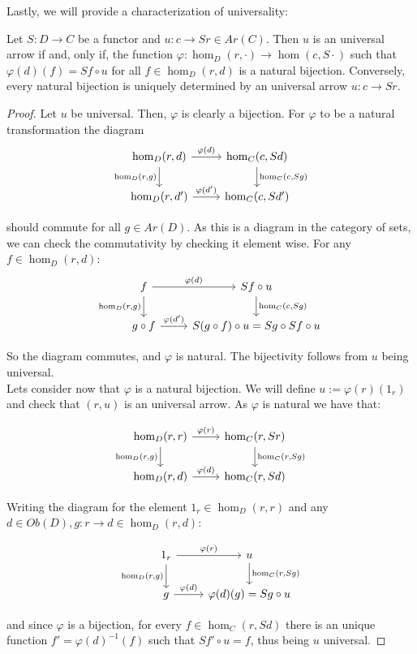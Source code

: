Lastly, we will provide a characterization of universality:
\begin{proposition}\label{Yoneda-proposition}
  Let $S: D \to C$ be a functor and $u:c\to Sr\in Ar(C)$. Then $u$ is an universal arrow if and, only if, the function $\varphi:\hom_D(r,\cdot)\to \hom(c,S\cdot)$ such that $\varphi(d)(f)= Sf\circ u$ for all $f\in \hom_D(r,d)$ is a natural bijection. Conversely, every natural bijection is uniquely determined by an universal arrow $u:c\to Sr$. 
\end{proposition}
\begin{proof}
  Let $u$ be universal. Then, $\varphi$ is clearly a bijection. For $\varphi$ to be a natural transformation the diagram 
  \[
    \begin{tikzcd}
      \hom_D(r,d)\arrow[swap]{d}{\hom_D(r,g)}\arrow{r}{\varphi(d)} & \hom_C(c,Sd)\arrow{d}{\hom_C(c,Sg)}\\
      \hom_D(r,d')\arrow{r}{\varphi(d')} & \hom_C(c,Sd')
    \end{tikzcd}
  \]

  should commute for all $g\in Ar(D)$. As this is a diagram in the category of sets, we can check the commutativity by checking it element wise. For any $f \in\hom_D(r,d)$:
  \[
    \begin{tikzcd}
      f\arrow[swap]{d}{\hom_D(r,g)}\arrow{r}{\varphi(d)} & Sf\circ u \arrow{d}{\hom_C(c,Sg)}\\
      g\circ f \arrow{r}{\varphi(d')} & S(g\circ f) \circ u = Sg\circ Sf \circ u
    \end{tikzcd}
  \]

  So the diagram commutes, and $\varphi$ is natural. The bijectivity follows from $u$ being universal.\\

  Lets consider now that $\varphi$ is a natural bijection. We will define $u := \varphi(r)(1_r)$ and check that $(r,u)$ is an universal arrow. As $\varphi$ is natural we have that:

  \[
    \begin{tikzcd}
      \hom_D(r,r)\arrow[swap]{d}{\hom_D(r,g)}\arrow{r}{\varphi(r)} & \hom_C(r,Sr)\arrow{d}{\hom_C(r,Sg)}\\
      \hom_D(r,d)\arrow{r}{\varphi(d)} & \hom_C(r,Sd)
    \end{tikzcd}
  \]

  Writing the diagram for the element $1_r\in\hom_D(r,r)$ and any $d\in Ob(D), g:r\to d\in \hom_D(r,d)$:

  \[
    \begin{tikzcd}
      1_r \arrow[swap]{d}{\hom_D(r,g)}\arrow{r}{\varphi(r)} & u \arrow{d}{\hom_C(r,Sg)}\\
      g\arrow{r}{\varphi(d)} & \varphi(d)(g)= Sg\circ u
    \end{tikzcd}
  \]

  and since $\varphi$ is a bijection, for every $f\in \hom_C(r,Sd)$ there is an unique function $f' = \varphi(d)^{-1}(f)$ such that $Sf'\circ u = f$, thus being $u$ universal.

\end{proof}

